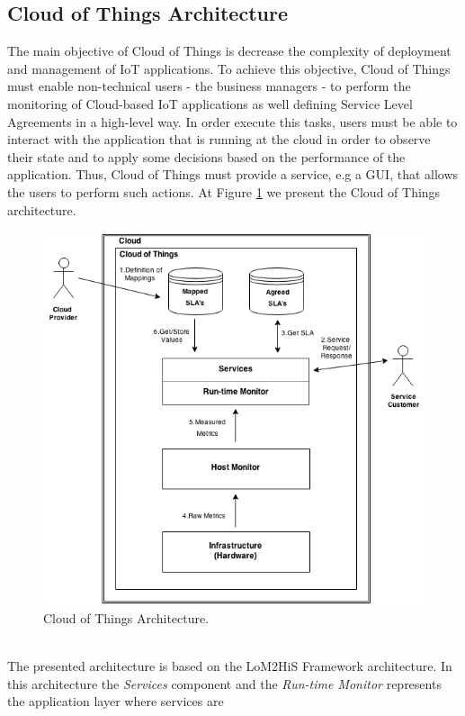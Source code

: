 \subsection{Cloud of Things Architecture}
\label{sub:cloud_of_things_architecture}
The main objective of Cloud of Things is decrease the complexity of deployment and management of IoT applications. To achieve this objective, Cloud of Things must enable non-technical users - the business managers - to perform the
monitoring of Cloud-based IoT applications as well defining Service Level Agreements in a high-level way. In order execute this tasks, users must be able to interact with the application that is running at the cloud in order
to observe their state and to apply some decisions based on the performance of the application. Thus, Cloud of Things must provide a service, e.g a GUI, that allows the users to perform such actions. At Figure \ref{fig:cloud_of_things_architecture}
we present the Cloud of Things architecture.
\vspace{1in}
\begin{figure}[h!]
  \centering
  \includegraphics[width=.8\textwidth]{./images/cloud-of-things-architecture}
  \caption{Cloud of Things Architecture.}
  \label{fig:cloud_of_things_architecture}
\end{figure}\\
The presented architecture is based on the LoM2HiS Framework \cite{emeakaroha2010low} architecture. In this architecture the \textit{Services} component and the \textit{Run-time Monitor} represents the application layer where services are
